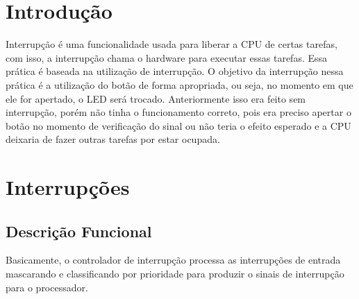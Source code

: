 \documentclass[12pt]{article}
\begin{document}
\section{Introdução}
	Interrupção é uma funcionalidade usada para liberar a CPU de certas tarefas, com isso, a interrupção chama o hardware para executar essas tarefas. Essa prática é baseada na utilização de interrupção. O objetivo da interrupção nessa prática é a utilização do botão de forma apropriada, ou seja, no momento em que ele for apertado, o LED será trocado. Anteriormente isso era feito sem interrupção, porém não tinha o funcionamento correto, pois era preciso apertar o botão no momento de verificação do sinal ou não teria o efeito esperado e a CPU deixaria de fazer outras tarefas por estar ocupada. 
\section{Interrupções}
	\subsection{Descrição Funcional}
		Basicamente, o controlador de interrupção processa as interrupções de entrada mascarando e classificando por prioridade para produzir o
		sinais de interrupção para o processador.
\end{document}

